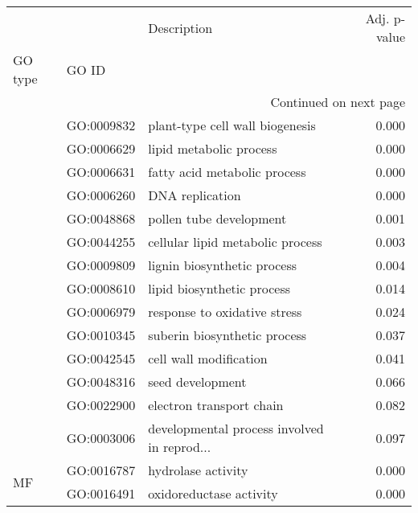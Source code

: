 \begin{longtable}{lllr}
\toprule
   &            &                                  Description &  Adj. p-value \\
GO type & GO ID &                                              &               \\
\midrule
\endhead
\midrule
\multicolumn{4}{r}{{Continued on next page}} \\
\midrule
\endfoot

\bottomrule
\endlastfoot
\multirow{14}{*}{BP} & GO:0009832 &              plant-type cell wall biogenesis &         0.000 \\
   & GO:0006629 &                      lipid metabolic process &         0.000 \\
   & GO:0006631 &                 fatty acid metabolic process &         0.000 \\
   & GO:0006260 &                              DNA replication &         0.000 \\
   & GO:0048868 &                      pollen tube development &         0.001 \\
   & GO:0044255 &             cellular lipid metabolic process &         0.003 \\
   & GO:0009809 &                  lignin biosynthetic process &         0.004 \\
   & GO:0008610 &                   lipid biosynthetic process &         0.014 \\
   & GO:0006979 &                 response to oxidative stress &         0.024 \\
   & GO:0010345 &                 suberin biosynthetic process &         0.037 \\
   & GO:0042545 &                       cell wall modification &         0.041 \\
   & GO:0048316 &                             seed development &         0.066 \\
   & GO:0022900 &                     electron transport chain &         0.082 \\
   & GO:0003006 &  developmental process involved in reprod... &         0.097 \\
\cline{1-4}
\multirow{2}{*}{MF} & GO:0016787 &                           hydrolase activity &         0.000 \\
   & GO:0016491 &                      oxidoreductase activity &         0.000 \\
\end{longtable}
